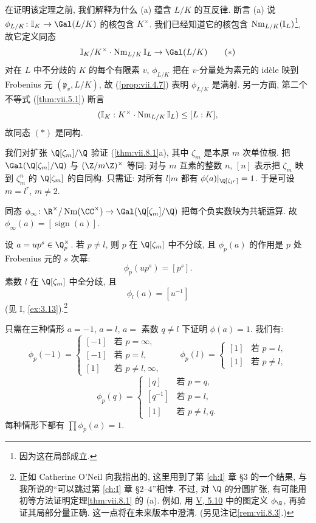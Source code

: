 在证明该定理之前, 我们解释为什么 (a) 蕴含 $L/K$ 的互反律. 断言 (a) 说 $\phi_{L/K}\colon\mathbb{I}_K\to\Gal(L/K)$ 的核包含 $K^{\times}$. 我们已经知道它的核包含 $\operatorname{Nm}_{L/K}(\mathbb{I}_L)$\footnote{因为这在局部成立.}, 故它定义同态
\begin{equation*}
\mathbb{I}_{K}/K^{\times}\cdot\Nm_{L/K}\mathbb{I}_{L}\to\Gal(L/K)\tag{$*$}
\end{equation*}
对在 $L$ 中不分歧的 $K$ 的每个有限素 $v$, $\phi_{L/K}$ 把在 $v$-分量处为素元的 idèle 映到 Frobenius 元 $(\mathfrak{p}_v,L/K)$, 故 (\ref{prop:vii.4.7}) 表明 $\phi_{L/K}$ 是满射. 另一方面, 第二个不等式 (\ref{thm:vii.5.1}) 断言
\[
(\mathbb{I}_{K}:K^{\times}\cdot\operatorname{Nm}_{L/K}\mathbb{I}_{L})\le[L:K],
\]
故同态 $(*)$ 是同构.

\begin{example}\label{ex:vii.8.2}
我们对扩张 $\Q[\zeta_m]/\Q$ 验证 (\ref{thm:vii.8.1}a), 其中 $\zeta_m$ 是本原 $m$ 次单位根. 把 $\Gal(\Q[\zeta_m]/\Q)$ 与 $(\Z/m\Z)^{\times}$ 等同: 对与 $m$ 互素的整数 $n$, $[n]$ 表示把 $\zeta_m$ 映到 $\zeta_m^{n}$ 的 $\Q[\zeta_m]$ 的自同构. 只需证: 对所有 $l|m$ 都有 $\phi(a)|_{\Q[\zeta_{l^{r}}]}=1$. 于是可设 $m=l^{r}$, $m\ne 2$.

同态 $\phi_{\infty}\colon\R^{\times}/\Nm(\CC^{\times})\to\Gal(\Q[\zeta_m]/\Q)$ 把每个负实数映为共轭运算. 故 $\phi_{\infty}(a)=[\operatorname{sign}(a)]$.

设 $a=up^{s}\in\Q_p^{\times}$. 若 $p\ne l$, 则 $p$ 在 $\Q[\zeta_m]$ 中不分歧, 且 $\phi_p(a)$ 的作用是 $p$ 处 Frobenius 元的 $s$ 次幂:
\[
\phi_{p}(up^{s})=[p^{s}].
\]
素数 $l$ 在 $\Q[\zeta_m]$ 中全分歧, 且
\[
\phi_{l}(a)=[u^{-1}]
\]
(见 I, \ref{ex:3.13}).\footnote{正如 Catherine O'Neil 向我指出的, 这里用到了第 \ref{ch:I} 章 \S 3 的一个结果, 与我所说的``可以跳过第 \ref{ch:I} 章 \S 2--4''相悖. 不过, 对 $\Q$ 的分圆扩张, 有可能用初等方法证明定理\ref{thm:vii.8.1} 的 (a). 例如, 用 \hyperlink{item:v.5.10}{V, 5.10} 中的图定义 $\phi_{\Q}$, 再验证其局部分量正确. 这一点将在未来版本中澄清. (另见注记\ref{rem:vii.8.3}.)}

只需在三种情形 $a=-1$, $a=l$, $a=$ 素数 $q\ne l$ 下证明 $\phi(a)=1$. 我们有:
\[
\phi_{p}(-1)=
\begin{cases}
[-1] & \text{若 } p=\infty,\\
[-1] & \text{若 } p=l,\\
[1] & \text{若 } p\ne l,\infty,
\end{cases}
\qquad
\phi_{p}(l)=
\begin{cases}
[1] & \text{若 } p=l,\\
[1] & \text{若 } p\ne l,
\end{cases}
\]
\[
\phi_{p}(q)=
\begin{cases}
[q] & \text{若 } p=q,\\
[q^{-1}] & \text{若 } p=l,\\
[1] & \text{若 } p\ne l,q.
\end{cases}
\]
每种情形下都有 $\prod\phi_p(a)=1$.
\end{example}

